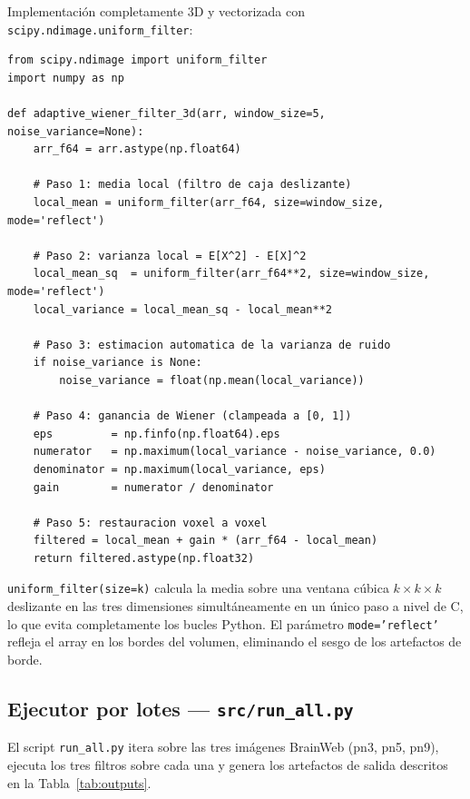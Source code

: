 \documentclass[12pt, a4paper]{article}
\begin{document}
Implementación completamente 3D y vectorizada con \texttt{scipy.ndimage.uniform\_filter}:

\begin{lstlisting}[caption={Núcleo del Filtro de Wiener Adaptativo (src/wiener.py)}]
from scipy.ndimage import uniform_filter
import numpy as np

def adaptive_wiener_filter_3d(arr, window_size=5, noise_variance=None):
    arr_f64 = arr.astype(np.float64)

    # Paso 1: media local (filtro de caja deslizante)
    local_mean = uniform_filter(arr_f64, size=window_size, mode='reflect')

    # Paso 2: varianza local = E[X^2] - E[X]^2
    local_mean_sq  = uniform_filter(arr_f64**2, size=window_size, mode='reflect')
    local_variance = local_mean_sq - local_mean**2

    # Paso 3: estimacion automatica de la varianza de ruido
    if noise_variance is None:
        noise_variance = float(np.mean(local_variance))

    # Paso 4: ganancia de Wiener (clampeada a [0, 1])
    eps         = np.finfo(np.float64).eps
    numerator   = np.maximum(local_variance - noise_variance, 0.0)
    denominator = np.maximum(local_variance, eps)
    gain        = numerator / denominator

    # Paso 5: restauracion voxel a voxel
    filtered = local_mean + gain * (arr_f64 - local_mean)
    return filtered.astype(np.float32)
\end{lstlisting}

\texttt{uniform\_filter(size=k)} calcula la media sobre una ventana cúbica $k\times k\times k$
deslizante en las tres dimensiones simultáneamente en un único paso a nivel de C, lo que
evita completamente los bucles Python. El parámetro \texttt{mode='reflect'} refleja el
array en los bordes del volumen, eliminando el sesgo de los artefactos de borde.

\subsection{Ejecutor por lotes — \texttt{src/run\_all.py}}

El script \texttt{run\_all.py} itera sobre las tres imágenes BrainWeb (pn3, pn5, pn9),
ejecuta los tres filtros sobre cada una y genera los artefactos de salida descritos en la
Tabla~\ref{tab:outputs}.
\end{document}
